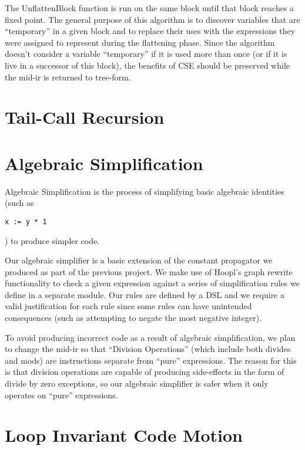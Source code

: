 \documentclass[11pt]{article}
\begin{document}
\noindent The UnflattenBlock function is run on the same block until that block
reaches a fixed point. The general purpose of this algorithm is to
discover variables that are ``temporary'' in a given block and to replace
their uses with the expressions they were assigned to represent during
the flattening phase. Since the algorithm doesn't consider a variable
``temporary'' if it is used more than once (or if it is live in a
successor of this block), the benefits of CSE should be preserved
while the mid-ir is returned to tree-form. 

\section {Tail-Call Recursion}
\label{sec:tailcall}

\section {Algebraic Simplification}
\label{sec:algebra}

Algebraic Simplification is the process of simplifying basic algebraic
identities (such as \begin{verbatim}x := y * 1 \end{verbatim}) to
produce simpler code. 

Our algebraic simplifier is a basic extension of the constant
propagator we produced as part of the previous project. We make use of
Hoopl's graph rewrite functionality to check a given expression
against a series of simplification rules we define in a separate
module. Our rules are defined by a DSL and we require a valid
justification for each rule since some rules can have unintended
consequences (such as attempting to negate the most negative
integer). 

To avoid producing incorrect code as a result of algebraic
simplification, we plan to change the mid-ir so that ``Division
Operations'' (which include both divides and mods) are instructions
separate from ``pure'' expressions. The reason for this is that
division operations are capable of producing side-effects in the form
of divide by zero exceptions, so our algebraic simplifier is safer
when it only operates on ``pure'' expressions. 



\section {Loop Invariant Code Motion}
\label{sec:codehoist}
\end{document}
